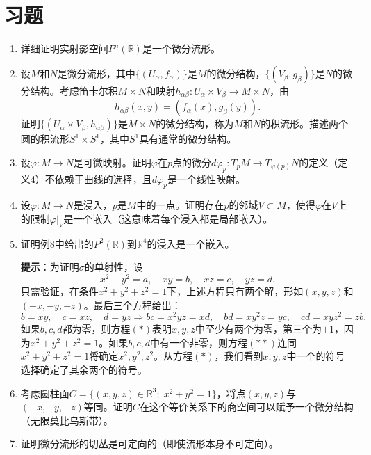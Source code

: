 \documentclass[12pt,a4paper]{ctexbook}
\begin{document}
\section*{习题}
\begin{enumerate}
    \item 详细证明实射影空间$P^n(\mathbb{R})$是一个微分流形。
    
    \item 设$M$和$N$是微分流形，其中$\{(U_\alpha,f_\alpha)\}$是$M$的微分结构，$\{(V_\beta,g_\beta)\}$是$N$的微分结构。考虑笛卡尔积$M\times N$和映射$h_{\alpha\beta}:U_\alpha\times V_\beta\to M\times N$，由
    $$h_{\alpha\beta}(x,y) = (f_\alpha(x),g_\beta(y)).$$
    证明$\{(U_\alpha\times V_\beta,h_{\alpha\beta})\}$是$M\times N$的微分结构，称为$M$和$N$的积流形。描述两个圆的积流形$S^1\times S^1$，其中$S^1$具有通常的微分结构。
    
    \item 设$\varphi:M\to N$是可微映射。证明$\varphi$在$p$点的微分$d\varphi_p:T_pM\to T_{\varphi(p)}N$的定义（定义4）不依赖于曲线的选择，且$d\varphi_p$是一个线性映射。
    
    \item 设$\varphi:M\to N$是浸入，$p$是$M$中的一点。证明存在$p$的邻域$V\subset M$，使得$\varphi$在$V$上的限制$\varphi|_V$是一个嵌入（这意味着每个浸入都是局部嵌入）。
    
    \item 证明例8中给出的$P^2(\mathbb{R})$到$\mathbb{R}^4$的浸入是一个嵌入。
    
    \textbf{提示}：为证明$\sigma$的单射性，设
    $$x^2-y^2 = a,\quad xy = b,\quad xz = c,\quad yz = d. \tag{$*$}$$
    只需验证，在条件$x^2+y^2+z^2=1$下，上述方程只有两个解，形如$(x,y,z)$和$(-x,-y,-z)$。最后三个方程给出：
    $$b = xy,\quad c = xz,\quad d = yz \Rightarrow bc = x^2yz = xd,\quad bd = xy^2z = yc,\quad cd = xyz^2 = zb. \tag{$**$}$$
    如果$b,c,d$都为零，则方程$(*)$表明$x,y,z$中至少有两个为零，第三个为$\pm 1$，因为$x^2+y^2+z^2=1$。如果$b,c,d$中有一个非零，则方程$(**)$连同$x^2+y^2+z^2=1$将确定$x^2,y^2,z^2$。从方程$(*)$，我们看到$x,y,z$中一个的符号选择确定了其余两个的符号。
    
    \item 考虑圆柱面$C = \{(x,y,z)\in\mathbb{R}^3;\; x^2+y^2=1\}$，将点$(x,y,z)$与$(-x,-y,-z)$等同。证明$C$在这个等价关系下的商空间可以赋予一个微分结构（无限莫比乌斯带）。
    
    \item 证明微分流形的切丛是可定向的（即使流形本身不可定向）。
    

\end{enumerate}
\end{document}

